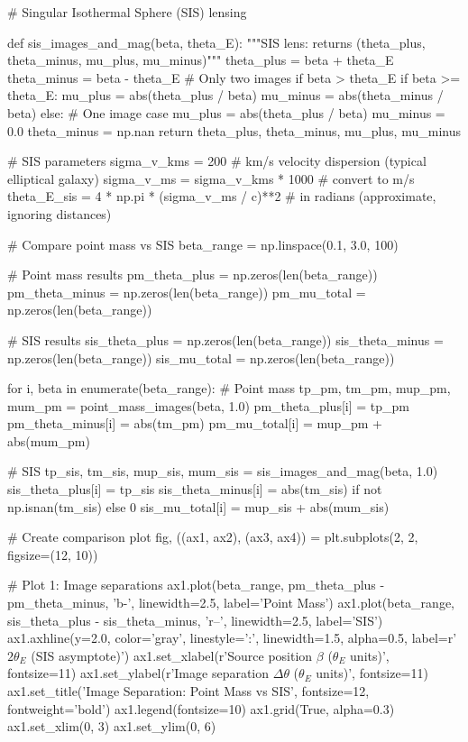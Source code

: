 \documentclass[11pt,a4paper]{article}
\begin{document}
\begin{pycode}
# Singular Isothermal Sphere (SIS) lensing

def sis_images_and_mag(beta, theta_E):
    """SIS lens: returns (theta_plus, theta_minus, mu_plus, mu_minus)"""
    theta_plus = beta + theta_E
    theta_minus = beta - theta_E
    # Only two images if beta > theta_E
    if beta >= theta_E:
        mu_plus = abs(theta_plus / beta)
        mu_minus = abs(theta_minus / beta)
    else:
        # One image case
        mu_plus = abs(theta_plus / beta)
        mu_minus = 0.0
        theta_minus = np.nan
    return theta_plus, theta_minus, mu_plus, mu_minus

# SIS parameters
sigma_v_kms = 200  # km/s velocity dispersion (typical elliptical galaxy)
sigma_v_ms = sigma_v_kms * 1000  # convert to m/s
theta_E_sis = 4 * np.pi * (sigma_v_ms / c)**2  # in radians (approximate, ignoring distances)

# Compare point mass vs SIS
beta_range = np.linspace(0.1, 3.0, 100)

# Point mass results
pm_theta_plus = np.zeros(len(beta_range))
pm_theta_minus = np.zeros(len(beta_range))
pm_mu_total = np.zeros(len(beta_range))

# SIS results
sis_theta_plus = np.zeros(len(beta_range))
sis_theta_minus = np.zeros(len(beta_range))
sis_mu_total = np.zeros(len(beta_range))

for i, beta in enumerate(beta_range):
    # Point mass
    tp_pm, tm_pm, mup_pm, mum_pm = point_mass_images(beta, 1.0)
    pm_theta_plus[i] = tp_pm
    pm_theta_minus[i] = abs(tm_pm)
    pm_mu_total[i] = mup_pm + abs(mum_pm)

    # SIS
    tp_sis, tm_sis, mup_sis, mum_sis = sis_images_and_mag(beta, 1.0)
    sis_theta_plus[i] = tp_sis
    sis_theta_minus[i] = abs(tm_sis) if not np.isnan(tm_sis) else 0
    sis_mu_total[i] = mup_sis + abs(mum_sis)

# Create comparison plot
fig, ((ax1, ax2), (ax3, ax4)) = plt.subplots(2, 2, figsize=(12, 10))

# Plot 1: Image separations
ax1.plot(beta_range, pm_theta_plus - pm_theta_minus, 'b-', linewidth=2.5,
        label='Point Mass')
ax1.plot(beta_range, sis_theta_plus - sis_theta_minus, 'r--', linewidth=2.5,
        label='SIS')
ax1.axhline(y=2.0, color='gray', linestyle=':', linewidth=1.5, alpha=0.5,
           label=r'$2\theta_E$ (SIS asymptote)')
ax1.set_xlabel(r'Source position $\beta$ ($\theta_E$ units)', fontsize=11)
ax1.set_ylabel(r'Image separation $\Delta\theta$ ($\theta_E$ units)', fontsize=11)
ax1.set_title('Image Separation: Point Mass vs SIS', fontsize=12, fontweight='bold')
ax1.legend(fontsize=10)
ax1.grid(True, alpha=0.3)
ax1.set_xlim(0, 3)
ax1.set_ylim(0, 6)


\end{pycode}
\end{document}
